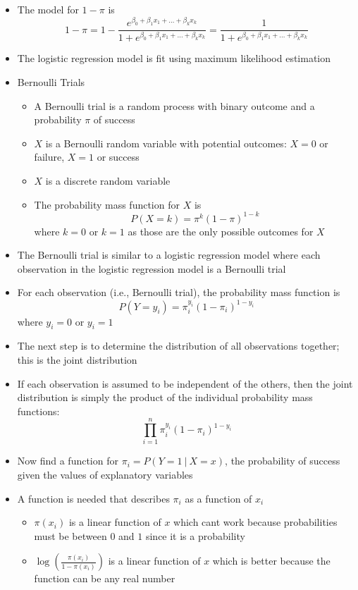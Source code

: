 \documentclass[12pt]{article}
\begin{document}
\begin{itemize}
\item The model for $1-\pi$ is $$ 1 - \pi = 1 - \frac{e^{\beta_0 + \beta_1x_1 + \dots + \beta_kx_k}}{1 + e^{\beta_0 + \beta_1x_1 + \dots + \beta_kx_k}} = \frac{1}{1 + e^{\beta_0 + \beta_1x_1 + \dots + \beta_kx_k}} $$ 
\item The logistic regression model is fit using maximum likelihood estimation 
\item Bernoulli Trials \begin{itemize}
\item A Bernoulli trial is a random process with binary outcome and a probability $\pi$ of success 
\item $X$ is a Bernoulli random variable with potential outcomes: $X = 0$ or failure, $X = 1$ or success 
\item $X$ is a discrete random variable 
\item The probability mass function for $X$ is $$ P(X = k) = \pi^k(1-\pi)^{1-k} $$ where $k=0$ or $k=1$ as those are the only possible outcomes for $X$ \end{itemize} 
\item The Bernoulli trial is similar to a logistic regression model where each observation in the logistic regression model is a Bernoulli trial 
\item For each observation (i.e., Bernoulli trial), the probability mass function is $$ P(Y = y_i) = \pi_i^{y_i}(1-\pi_i)^{1-y_i} $$ where $y_i = 0$ or $y_i = 1$ 
\item The next step is to determine the distribution of all observations together; this is the joint distribution 
\item If each observation is assumed to be independent of the others, then the joint distribution is simply the product of the individual probability mass functions: $$ \prod_{i=1}^n \pi_i^{y_i}(1-\pi_i)^{1-y_i} $$ 
\item Now find a function for $\pi_i  = P(Y=1~|~X = x)$, the probability of success given the values of explanatory variables
\item A function is needed that describes $\pi_i$ as a function of $x_i$ \begin{itemize} 
\item $\pi(x_i)$ is a linear function of $x$ which cant work because probabilities must be between $0$ and $1$ since it is a probability 
\item $\log\left( \frac{\pi(x_i)}{1-\pi(x_i)} \right)$ is a linear function of $x$ which is better because the function can be any real number 

\end{itemize}
\end{itemize}
\end{document}
